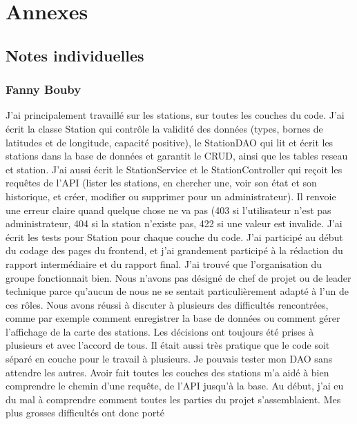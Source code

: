 \documentclass[
  french,
  11pt,
  a4paper,
]{article}
\begin{document}
\pagebreak

\section{Annexes}\label{annexes}

\subsection{Notes individuelles}\label{notes-individuelles}

\subsubsection{Fanny Bouby}\label{fanny-bouby}

J'ai principalement travaillé sur les stations, sur toutes les couches
du code. J'ai écrit la classe Station qui contrôle la validité des
données (types, bornes de latitudes et de longitude, capacité positive),
le StationDAO qui lit et écrit les stations dans la base de données et
garantit le CRUD, ainsi que les tables reseau et station. J'ai aussi
écrit le StationService et le StationController qui reçoit les requêtes
de l'API (lister les stations, en chercher une, voir son état et son
historique, et créer, modifier ou supprimer pour un administrateur). Il
renvoie une erreur claire quand quelque chose ne va pas (403 si
l'utilisateur n'est pas administrateur, 404 si la station n'existe pas,
422 si une valeur est invalide. J'ai écrit les tests pour Station pour
chaque couche du code. J'ai participé au début du codage des pages du
frontend, et j'ai grandement participé à la rédaction du rapport
intermédiaire et du rapport final. J'ai trouvé que l'organisation du
groupe fonctionnait bien. Nous n'avons pas désigné de chef de projet ou
de leader technique parce qu'aucun de nous ne se sentait
particulièrement adapté à l'un de ces rôles. Nous avons réussi à
discuter à plusieurs des difficultés rencontrées, comme par exemple
comment enregistrer la base de données ou comment gérer l'affichage de
la carte des stations. Les décisions ont toujours été prises à plusieurs
et avec l'accord de tous. Il était aussi très pratique que le code soit
séparé en couche pour le travail à plusieurs. Je pouvais tester mon DAO
sans attendre les autres. Avoir fait toutes les couches des stations m'a
aidé à bien comprendre le chemin d'une requête, de l'API jusqu'à la
base. Au début, j'ai eu du mal à comprendre comment toutes les parties
du projet s'assemblaient. Mes plus grosses difficultés ont donc porté
\end{document}
